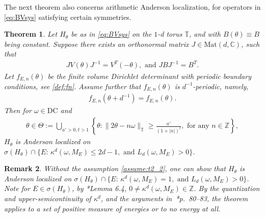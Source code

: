 \documentclass[11pt]{amsart}
\newtheorem{theorem}{Theorem}[section]
\newtheorem{remark}[theorem]{Remark}
\newcommand{\Z}{\mathbb Z}
\newcommand{\C}{\mathbb C}
\newcommand{\T}{\mathbb T}
\begin{document}
The next theorem also concerns arithmetic Anderson localization, for operators in \eqref{eq:BVsys} satisfying certain symmetries. 
\begin{theorem}\label{thm:acceleration=d_2}
Let $H_{\theta}$ be as in \eqref{eq:BVsys} on the $1$-d torus $\T$, and with $B(\theta)\equiv B$ being constant.
Suppose there exists an orthonormal matrix $J\in \mathrm{Mat}(d,\C)$, such that 
\begin{align}\label{assume:t2_1}
JV(\theta)J^{-1}=V^T(-\theta), \text{ and } JBJ^{-1}=B^T.
\end{align}
Let $f_{E,n}(\theta)$ be the finite volume Dirichlet determinant with periodic boundary conditions, see \eqref{def:fn}.
Assume further that $f_{E,n}(\theta)$ is $d^{-1}$-periodic, namely,
\begin{align}\label{assume:t2_2}
f_{E,n}(\theta+d^{-1})=f_{E,n}(\theta).
\end{align}
Then for $\omega\in \mathrm{DC}$ and 
\begin{align}\label{def:theta}
    \theta\in \Theta:=\bigcup_{a'>0, t>1}\left\{\theta: \|2\theta-n\omega\|_{\T}\geq \frac{a'}{(1+|n|)^t}, \text{ for any } n\in \Z\right\}, 
\end{align}
$H_{\theta}$ is Anderson localized on $\sigma(H_{\theta})\cap \{E:\, \kappa^d(\omega,M_E)\leq 2d-1, \text{ and } L_d(\omega,M_E)>0\}$.
\end{theorem}

\begin{remark}
    Without the assumption \eqref{assume:t2_2}, one can show that $H_{\theta}$ is Anderson localized on $\sigma(H_{\theta})\cap \{E:\, \kappa^d(\omega,M_E)=1, \text{ and } L_d(\omega,M_E)>0\}$. 
    Note for $E\in \sigma(H_{\theta})$, by \cite{AJS}*{Lemma 6.4}, $0\neq \kappa^d(\omega,M_E)\in \Z$. By the quantization and upper-semicontinuity of $\kappa^d$, and the arguments in~\cite{B}*{p.~80--83}, the theorem applies to a set of positive measure of energies or to no energy at all. 
\end{remark}
\end{document}
